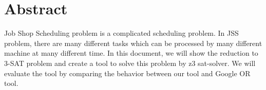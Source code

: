 \section*{Abstract}
Job Shop Scheduling problem is a complicated scheduling problem.  In JSS problem, there are many different tasks which can be processed by many different machine at many different time. In this document, we will show the reduction to 3-SAT problem and create a tool to solve this problem by z3 sat-solver. We will evaluate the tool by comparing the behavior between our tool and Google OR tool. 